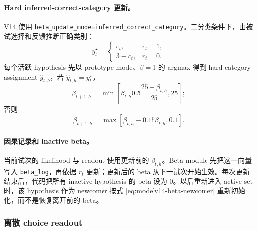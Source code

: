\paragraph{Hard inferred-correct-category 更新。}
V14 使用 \texttt{beta\_update\_mode=inferred\_correct\_category}。二分类条件下，由被试选择和反馈推断正确类别：
\begin{equation}
    y_t^\star
    =
    \begin{cases}
        c_t,&r_t=1,\\
        3-c_t,&r_t=0.
    \end{cases}
    \label{eq:modelv14-inferred-correct}
\end{equation}
每个活跃 hypothesis 先以 prototype mode、$\beta=1$ 的 argmax 得到 hard category assignment $\widehat y_{t,h}$。若 $\widehat y_{t,h}=y_t^\star$，
\begin{equation}
    \beta_{t+1,h}
    =
    \min\left[
        \beta_{t,h}
        0.5
        \frac{25-\beta_{t,h}}{25},
        25
    \right];
    \label{eq:modelv14-beta-reward}
\end{equation}
否则
\begin{equation}
    \beta_{t+1,h}
    =
    \max[
        \beta_{t,h}-0.15\beta_{t,h},
        0.1
    ].
    \label{eq:modelv14-beta-penalty}
\end{equation}

\paragraph{因果记录和 inactive beta。}
当前试次的 likelihood 与 readout 使用更新前的 $\beta_{t,h}$。Beta module 先把这一向量写入 \texttt{beta\_log}，再依据 $r_t$ 更新；更新后的 beta 从下一试次开始生效。每次更新结束后，代码把所有 inactive hypothesis 的 beta 设为 0。以后重新进入 active set 时，该 hypothesis 作为 newcomer 按式 \ref{eq:modelv14-beta-newcomer} 重新初始化，而不是恢复离开前的 beta。


\subsubsection{离散 choice readout}

